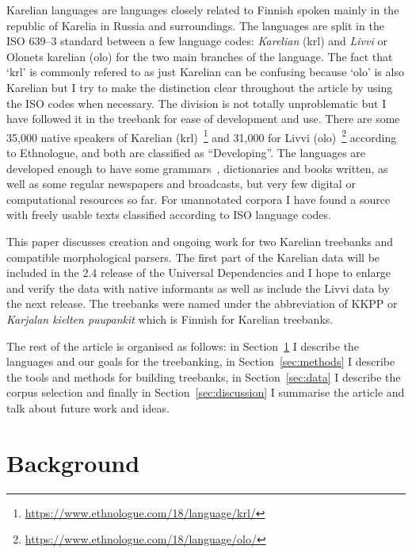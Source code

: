 \documentclass[11pt]{article}
\begin{document}
Karelian languages are languages closely related to Finnish spoken mainly in the
republic of Karelia in Russia and surroundings. The languages are split in the
ISO 639--3 standard between a few language codes: \textit{Karelian} (krl) and
\textit{Livvi} or Olonets karelian (olo) for the two main branches of the
language. The fact that `krl' is commonly refered to as just Karelian can be
confusing because `olo' is also Karelian but I try to make the distinction
clear throughout the article by using the ISO codes when necessary. The division
is not totally unproblematic but I have followed it in the treebank for ease of
development and use. There are some 35,000 native speakers of Karelian
(krl)~\footnote{\url{https://www.ethnologue.com/18/language/krl/}} and 31,000
for Livvi (olo)~\footnote{\url{https://www.ethnologue.com/18/language/olo/}} according to Ethnologue, and both are classified as ``Developing''.
The languages are developed enough to have some
grammars~\cite{zaikov2013vienankarjalan,ahtia1938karjalan,markianova2002karjalan},
dictionaries and books written, as well as some regular newspapers and
broadcasts, but very few digital or computational resources so far. For
unannotated corpora I have found a source with freely usable texts classified
according to ISO language codes.

This paper discusses creation and ongoing work for two Karelian treebanks and
compatible morphological parsers. The first part of the Karelian data will be
included in the 2.4 release of the Universal Dependencies and I hope to enlarge
and verify the data with native informants as well as include the Livvi data
by the next release. The treebanks were named under the abbreviation of KKPP or
\textit{Karjalan kielten puupankit} which is Finnish for Karelian treebanks.

The rest of the article is organised as follows: in Section~\ref{sec:background}
I describe the languages and our goals for the treebanking, in
Section~\ref{sec:methods} I describe the tools and methods for building
treebanks, in Section~\ref{sec:data} I describe the corpus selection and
finally in Section~\ref{sec:discussion} I summarise the article and talk about
future work and ideas.

\section{Background}
\label{sec:background}
\end{document}
